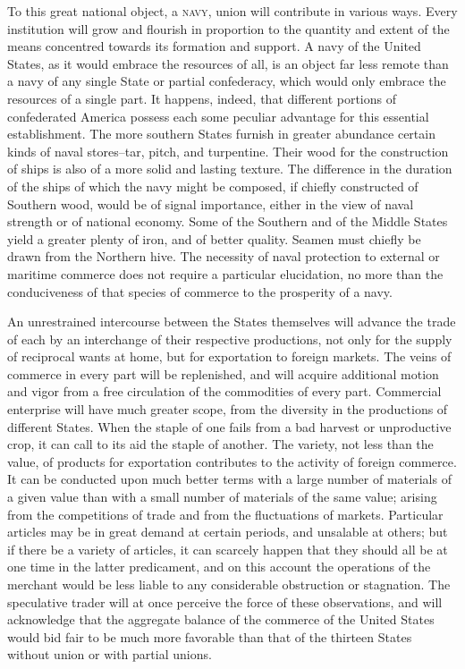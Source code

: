 To this great national object, a \textsc{navy}, union will contribute in various ways. 
Every institution will grow and flourish in proportion to the quantity and extent of the means concentred towards its formation and support. 
A navy of the United States, as it would embrace the resources of all, is an object far less remote than a navy of any single State or partial confederacy, which would only embrace the resources of a single part. 
It happens, indeed, that different portions of confederated America possess each some peculiar advantage for this essential establishment. 
The more southern States furnish in greater abundance certain kinds of naval stores--tar, pitch, and turpentine. 
Their wood for the construction of ships is also of a more solid and lasting texture. 
The difference in the duration of the ships of which the navy might be composed, if chiefly constructed of Southern wood, would be of signal importance, either in the view of naval strength or of national economy. 
Some of the Southern and of the Middle States yield a greater plenty of iron, and of better quality. 
Seamen must chiefly be drawn from the Northern hive. 
The necessity of naval protection to external or maritime commerce does not require a particular elucidation, no more than the conduciveness of that species of commerce to the prosperity of a navy.

An unrestrained intercourse between the States themselves will advance the trade of each by an interchange of their respective productions, not only for the supply of reciprocal wants at home, but for exportation to foreign markets. 
The veins of commerce in every part will be replenished, and will acquire additional motion and vigor from a free circulation of the commodities of every part. 
Commercial enterprise will have much greater scope, from the diversity in the productions of different States. 
When the staple of one fails from a bad harvest or unproductive crop, it can call to its aid the staple of another. 
The variety, not less than the value, of products for exportation contributes to the activity of foreign commerce. 
It can be conducted upon much better terms with a large number of materials of a given value than with a small number of materials of the same value; arising from the competitions of trade and from the fluctuations of markets. 
Particular articles may be in great demand at certain periods, and unsalable at others; but if there be a variety of articles, it can scarcely happen that they should all be at one time in the latter predicament, and on this account the operations of the merchant would be less liable to any considerable obstruction or stagnation. 
The speculative trader will at once perceive the force of these observations, and will acknowledge that the aggregate balance of the commerce of the United States would bid fair to be much more favorable than that of the thirteen States without union or with partial unions.

